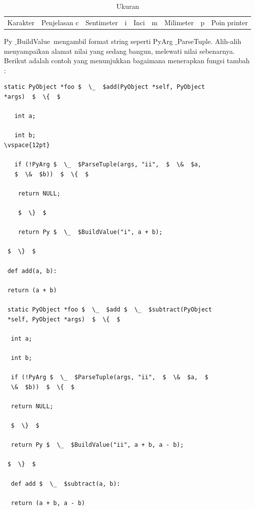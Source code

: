 

\begin{table}[ht]
	\caption{Ukuran}
	\begin{tabular*}{\textwidth}{@{\extracolsep{\fill}}lcc}
		\hline
		Karakter&  Penjelasan \cr
		\hline
		c&Sentimeter&\cr
		i&Inci&\cr
		m&Milimeter&\cr
		p&Poin printer\cr
		\hline
	\end{tabular*}
	\begin{tablenotes}
	\end{tablenotes}
\end{table}


\vspace{80pt}
Py $  \_  $BuildValue~mengambil format string seperti PyArg $  \_  $ParseTuple. Alih-alih menyampaikan alamat nilai yang sedang  bangun, melewati nilai sebenarnya. Berikut adalah contoh yang menunjukkan bagaimana menerapkan fungsi tambah : 

\begin{verbatim}
static PyObject *foo $  \_  $add(PyObject *self, PyObject 
*args)  $  \{  $ 

   int a; 

   int b; 
\vspace{12pt}

   if (!PyArg $  \_  $ParseTuple(args, "ii",  $  \&  $a,
   $  \&  $b))  $  \{  $ 

    return NULL;

    $  \}  $ 

    return Py $  \_  $BuildValue("i", a + b); 

 $  \}  $ 

 def add(a, b):

 return (a + b) 

 static PyObject *foo $  \_  $add $  \_  $subtract(PyObject 
 *self, PyObject *args)  $  \{  $ 

  int a; 

  int b; 

  if (!PyArg $  \_  $ParseTuple(args, "ii",  $  \&  $a,  $  
  \&  $b))  $  \{  $ 

  return NULL; 

  $  \}  $ 

  return Py $  \_  $BuildValue("ii", a + b, a - b); 

 $  \}  $ 

  def add $  \_  $subtract(a, b): 

  return (a + b, a - b) 
\end{verbatim}  


